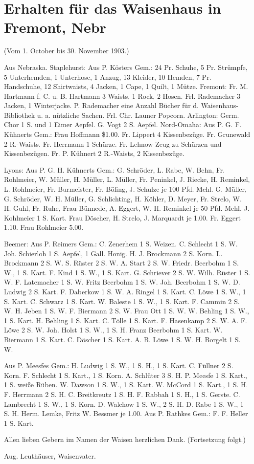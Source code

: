 \chapter[Waisenhaus in Fremont]{Erhalten für das Waisenhaus in Fremont, Nebr}

(Vom 1. October bis 30. November 1903.)

Aus Nebraska. Staplehurst: Aus P. Kösters Gem.: 24 Pr. Schuhe, 5 Pr. Strümpfe, 5 Unterhemden, 1 Unterhose, 1 Anzug, 13 Kleider, 10 Hemden, 7 Pr. Handschuhe, 12 Shirtwaists, 4 Jacken, 1 Cape, 1 Quilt, 1 Mütze. Fremont: Fr. M. Hartmann f. C. u. B. Hartmann 3 Waists, 1 Rock, 2 Hosen. Frl. Rademacher 3 Jacken, 1 Winterjacke. P. Rademacher eine Anzahl Bücher für d. Waisenhaus-Bibliothek u. a. nützliche Sachen. Frl. Chr. Launer Popcorn. Arlington: Germ. Chor 1 S. und 1 Eimer Aepfel. G. Vogt 2 S. Aepfel. Nord-Omaha: Aus P. G. F. Kühnerts Gem.: Frau Hoffmann \$1.00. Fr. Lippert 4 Kissenbezüge. Fr. Grunewald 2 R.-Waists. Fr. Herrmann 1 Schürze. Fr. Lehnow Zeug zu Schürzen und Kissenbezügen. Fr. P. Kühnert 2 R.-Waists, 2 Kissenbezüge.

Lyons: Aus P. G. H. Kühnerts Gem.: G. Schröder, L. Rabe, W. Behn, Fr. Rohlmeier, W. Müller, H. Müller, L. Müller, Fr. Peninkel, J. Riecke, H. Reminkel, L. Rohlmeier, Fr. Burmeister, Fr. Böling, J. Schulze je 100 Pfd. Mehl. G. Müller, G. Schröder, W. H. Müller, G. Schlichting, H. Köhler, D. Meyer, Fr. Strelo, W. H. Guhl, Fr. Ruhe, Frau Bünnede, A. Eggert, W. H. Reminkel je 50 Pfd. Mehl. J. Kohlmeier 1 S. Kart. Frau Döscher, H. Strelo, J. Marquardt je 1.00. Fr. Eggert 1.10. Frau Rohlmeier 5.00.

Beemer: Aus P. Reimers Gem.: C. Zenerhem 1 S. Weizen. C. Schlecht 1 S. W. Joh. Schierloh 1 S. Aepfel, 1 Gall. Honig. H. J. Brockmann 2 S. Korn. L. Brockmann 2 S. W. S. Rüster 2 S. W. A. Start 2 S. W. Friedr. Beerbohm 1 S. W., 1 S. Kart. F. Kind 1 S. W., 1 S. Kart. G. Schriever 2 S. W. Wilh. Rüster 1 S. W. F. Latemacher 1 S. W. Fritz Beerbohm 1 S. W. Joh. Beerbohm 1 S. W. D. Ludwig 2 S. Kart. F. Daberkow 1 S. W. A. Ringel 1 S. Kart. C. Löwe 1 S. W., 1 S. Kart. C. Schwarz 1 S. Kart. W. Baleste 1 S. W., 1 S. Kart. F. Cammin 2 S. W. H. Jeben 1 S. W. F. Biermann 2 S. W. Frau Ott 1 S. W. W. Behling 1 S. W., 1 S. Kart. H. Behling 1 S. Kart. C. Tölle 1 S. Kart. F. Hasenkamp 2 S. W. A. F. Löwe 2 S. W. Joh. Holst 1 S. W., 1 S. H. Franz Beerbohm 1 S. Kart. W. Biermann 1 S. Kart. C. Döscher 1 S. Kart. A. B. Löwe 1 S. W. H. Borgelt 1 S. W.

Aus P. Meesfes Gem.: H. Ludwig 1 S. W., 1 S. H., 1 S. Kart. C. Füllner 2 S. Korn. F. Schlecht 1 S. Kart., 1 S. Korn. A. Schlüter 3 S. H. P. Meesfe 1 S. Kart., 1 S. weiße Rüben. W. Dawson 1 S. W., 1 S. Kart. W. McCord 1 S. Kart., 1 S. H. F. Herrmann 2 S. H. C. Breitkreutz 1 S. H. F. Rabbah 1 S. H., 1 S. Gerste. C. Lambrecht 1 S. W., 1 S. Korn. D. Walchow 1 S. W., 2 S. H. D. Rabe 1 S. W., 1 S. H. Herm. Lemke, Fritz W. Bessmer je 1.00. Aus P. Rathkes Gem.: F. F. Heller 1 S. Kart.

Allen lieben Gebern im Namen der Waisen herzlichen Dank. (Fortsetzung folgt.)

Aug. Leuthäuser, Waisenvater.
